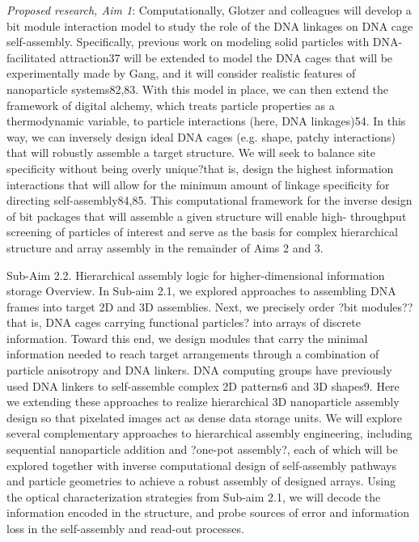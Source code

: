 \textit{Proposed research, Aim 1}: Computationally, Glotzer and colleagues will develop a bit module interaction model to study the role of the DNA linkages on DNA cage self-assembly. Specifically, previous work on modeling solid particles with DNA-facilitated attraction37 will be extended to model the DNA cages that will be experimentally made by Gang, and it will consider realistic features of nanoparticle systems82,83. With this model in place, we can then extend the framework of digital alchemy, which treats particle properties as a thermodynamic variable, to particle interactions (here, DNA linkages)54. In this way, we can inversely design ideal DNA cages (e.g. shape, patchy interactions) that will robustly assemble a target structure. We will seek to balance site specificity without being overly unique?that is, design the highest information interactions that will allow for the minimum amount of linkage specificity for directing self-assembly84,85. This computational framework for the inverse design of bit packages that will assemble a given structure will enable high- throughput screening of particles of interest and serve as the basis for complex hierarchical structure and array assembly in the remainder of Aims 2 and 3.

Sub-Aim 2.2. Hierarchical assembly logic for higher-dimensional information storage
Overview. In Sub-aim 2.1, we explored approaches to assembling DNA frames into target 2D and 3D assemblies. Next, we precisely order ?bit modules??that is, DNA cages carrying functional particles? into arrays of discrete information. Toward this end, we design modules that carry the minimal information needed to reach target arrangements through a combination of particle anisotropy and DNA linkers. DNA
 computing groups have previously used DNA linkers to self-assemble complex 2D patterns6 and 3D shapes9. Here we extending these approaches to realize hierarchical 3D nanoparticle assembly design so that pixelated images act as dense data storage units. We will explore several complementary approaches to hierarchical assembly engineering, including sequential nanoparticle addition and ?one-pot assembly?, each of which will be explored together with inverse computational design of self-assembly pathways and particle geometries to achieve a robust assembly of designed arrays. Using the optical characterization strategies from Sub-aim 2.1, we will decode the information encoded in the structure, and probe sources of error and information loss in the self-assembly and read-out processes.


